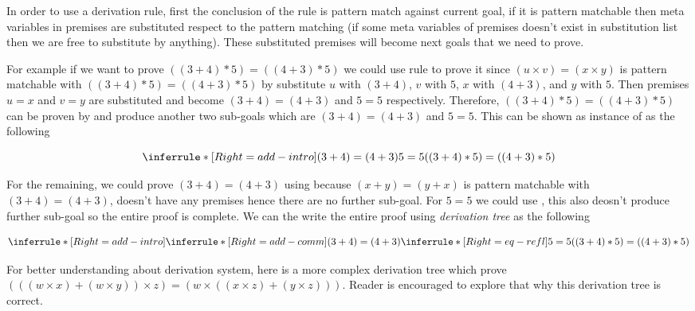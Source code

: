 \documentclass[master.tex]{subfiles}
\begin{document}
In order to use a derivation rule, first the conclusion of the rule is pattern
match against current goal, if it is pattern matchable then meta variables in
premises are substituted respect to the pattern matching (if some meta variables
of premises doesn't exist in substitution list then we are free to substitute by
anything). These substituted premises will become next goals that we need to prove.

For example if we want to prove $((3 + 4) * 5) = ((4 + 3) * 5)$ we could use
rule  to prove it since $(u \times v) = (x \times y)$ is
pattern matchable with $((3 + 4) * 5) = ((4 + 3) * 5)$ by substitute $u$ with $(3 +
4)$, $v$ with $5$, $x$ with $(4 + 3)$, and $y$ with $5$. Then premises $u = x$
and $v = y$ are substituted and become $(3 + 4) = (4 + 3)$ and $5 = 5$
respectively. Therefore, $((3 + 4) * 5) = ((4 + 3) * 5)$ can be proven by
 and produce another two sub-goals which are $(3 + 4) =
(4 + 3)$ and $5 = 5$. This can be shown as instance of 
as the following

$$ \derivTree{add-intro}{((3 + 4) * 5) = ((4 + 3) * 5)}{(3 + 4) = (4 + 3) \\ 5 = 5} $$

For the remaining, we could prove $(3 + 4) = (4 + 3)$ using
 because $(x + y) = (y + x)$ is pattern matchable with $(3
+ 4) = (4 + 3)$,  doesn't have any premises hence there are
no further sub-goal. For $5 = 5$ we could use , this also
deosn't produce further sub-goal so the entire proof is complete. We can the
write the entire proof using \emph{derivation tree} as the following

$$ \derivTree{add-intro}{((3 + 4) * 5) = ((4 + 3) * 5)}
     {\derivTree{add-comm}{(3 + 4) = (4 + 3)}{ } \\ \\ \\
      \derivTree{eq-refl}{5 = 5}{ }} $$

For better understanding about derivation system, here is a more complex
derivation tree which prove $(((w \times x) + (w \times y)) \times z) = (w \times ((x \times z) + (y
\times z)))$. Reader is encouraged to explore that why this derivation tree is
correct.
\end{document}
